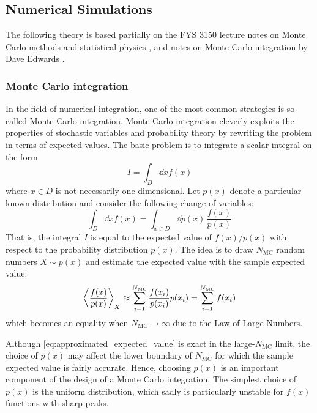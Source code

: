 \documentclass[nofootinbib,reprint,english]{revtex4-1}
\begin{document}
\subsection{Numerical Simulations}
The following theory is based partially on the FYS 3150 lecture notes on Monte Carlo methods \cite{montecarlo_lec_notes} and statistical physics \cite{statphys}, and notes on Monte Carlo integration by Dave Edwards \cite{montecarlo_Edwards}.
\subsubsection{Monte Carlo integration}
In the field of numerical integration, one of the most common strategies is so-called Monte Carlo integration. Monte Carlo integration cleverly exploits the properties of stochastic variables and probability theory by rewriting the problem in terms of expected values. The basic problem is to integrate a scalar integral on the form
\begin{equation}\label{eq:general_integral}
I=\int_D\dd{x}f(x)
\end{equation}
where \(x\in D\) is not necessarily one-dimensional. Let \(p(x)\) denote a particular known distribution and consider the following change of variables:
\begin{equation}\label{eq:integral_to_expected_value}
\int_D\dd{x}f(x)=\int_{x\in D}\dd{p(x)}\,\frac{f(x)}{p(x)}
\end{equation}
That is, the integral \(I\) is equal to the expected value of \(f(x)/p(x)\) with respect to the probability distribution \(p(x)\). The idea is to draw \(N_\text{MC}\) random numbers \(X\sim p(x)\) and estimate the expected value with the sample expected value:
\begin{equation}\label{eq:approximated_expected_value}
\expval{\frac{f(x)}{p(x)}}_X\approx\sum_{i=1}^{N_\text{MC}}\frac{f(x_i)}{p(x_i)}p(x_i)=\sum_{i=1}^{N_\text{MC}}f(x_i)
\end{equation}
which becomes an equality when \(N_\text{MC}\to\infty\) due to the Law of Large Numbers.

Although \eqref{eq:approximated_expected_value} is exact in the large-\(N_\text{MC}\) limit, the choice of \(p(x)\) may affect the lower boundary of \(N_\text{MC}\) for which the sample expected value is fairly accurate. Hence, choosing \(p(x)\) is an important component of the design of a Monte Carlo integration. The simplest choice of \(p(x)\) is the uniform distribution, which sadly is particularly unstable for \(f(x)\) functions with sharp peaks.
\end{document}
